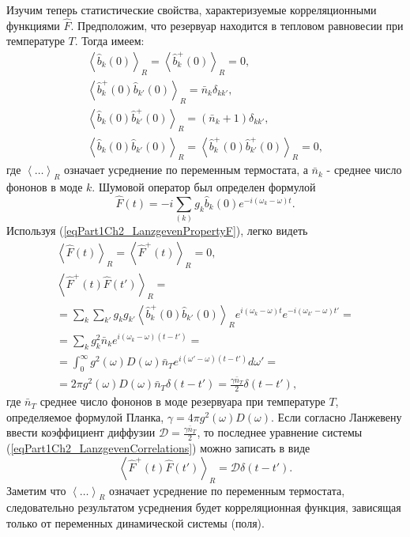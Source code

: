 Изучим теперь статистические свойства, характеризуемые корреляционными
функциями $\hat{F}$. Предположим, что резервуар находится в тепловом
равновесии при температуре $T$. Тогда имеем:
\begin{eqnarray}
\left<\hat{b}_k\left(0\right)\right>_R = 
\left<\hat{b}_k^{+}\left(0\right)\right>_R = 0, 
\nonumber \\
\left<\hat{b}_k^{+}\left(0\right)\hat{b}_{k'}\left(0\right)\right>_R = 
\bar{n}_k \delta_{k k'},
\nonumber \\
\left<\hat{b}_k\left(0\right)\hat{b}_{k'}^{+}\left(0\right)\right>_R = 
\left(\bar{n}_k + 1\right)\delta_{k k'},
\nonumber \\
\left<\hat{b}_k\left(0\right)\hat{b}_{k'}\left(0\right)\right>_R = 
\left<\hat{b}_k^{+}\left(0\right)\hat{b}_{k'}^{+}\left(0\right)\right>_R
= 0,
\label{eqPart1Ch2_LanzgevenPropertyF}
\end{eqnarray}
где $\left<\dots\right>_R$ означает усреднение по переменным
термостата, а $\bar{n}_k$ - среднее число фононов в моде $k$. Шумовой
оператор был определен формулой 
\begin{equation}
\hat{F}\left(t\right) = -i \sum_{(k)}g_k 
\hat{b}_k\left(0\right)
e^{-i \left(\omega_k - \omega\right)t}.
\label{eqPart1Ch2_LanzgevenDefenitionF}
\end{equation}
Используя (\ref{eqPart1Ch2_LanzgevenPropertyF}), легко видеть
\begin{eqnarray}
\left<\hat{F}\left(t\right)\right>_R =
\left<\hat{F}^{+}\left(t\right)\right>_R  = 0,
\nonumber \\
\left<\hat{F}^{+}\left(t\right)\hat{F}\left(t'\right)\right>_R = 
\nonumber \\
= \sum_{k}\sum_{k'}g_k g_{k'}
\left<\hat{b}_k^{+}\left(0\right)\hat{b}_{k'}\left(0\right)\right>_R 
e^{i\left(\omega_k - \omega\right)t} 
 e^{-i\left(\omega_{k'} - \omega\right)t'} =
\nonumber \\
= \sum_{k}g_k^2 \bar{n}_k 
e^{i\left(\omega_k - \omega\right)\left(t - t'\right)} = 
\nonumber \\
=
\int_0^\infty
g^2\left(\omega\right)D\left(\omega\right)\bar{n}_T
e^{i\left(\omega' - \omega\right)\left(t - t'\right)}d \omega' = 
\nonumber \\
= 2 \pi
g^2\left(\omega\right)D\left(\omega\right)\bar{n}_T
\delta\left(t - t'\right) =
\frac{\gamma \bar{n}_{T}}{2} \delta\left(t - t'\right),
\label{eqPart1Ch2_LanzgevenCorrelations}
\end{eqnarray}
где $\bar{n}_T$ среднее число фононов в моде резервуара при
температуре $T$, определяемое формулой Планка,
$\gamma = 4 \pi g^2\left(\omega\right)D\left(\omega\right)$.
Если согласно Ланжевену ввести коэффициент диффузии $\mathcal{D} =
\frac{\gamma \bar{n}_{T}}{2}$, то последнее уравнение системы
(\ref{eqPart1Ch2_LanzgevenCorrelations}) можно записать в виде
\begin{equation}
\left<\hat{F}^{+}\left(t\right)\hat{F}\left(t'\right)\right>_R = 
\mathcal{D} \delta\left(t - t'\right). 
\nonumber
\end{equation}
Заметим что $\left<\dots\right>_R$ означает усреднение по переменным
термостата, следовательно результатом усреднения будет корреляционная
функция, зависящая только от переменных динамической системы (поля).

